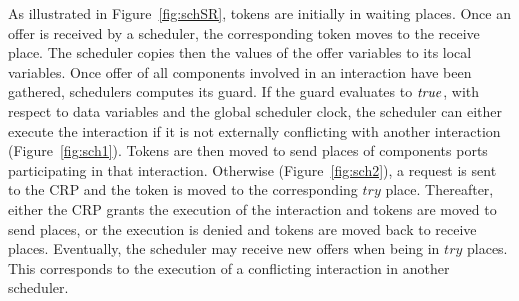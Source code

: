As illustrated in Figure~\ref{fig:schSR}, tokens are initially in waiting places. Once an offer
is received by a scheduler, the corresponding token moves to the receive place. The scheduler
copies then the values of the offer variables to its local variables. Once offer of all 
components involved in an interaction have been gathered, schedulers computes its guard. If 
the guard evaluates to $\textnormal{\textit{true}}$, with respect to data variables and the global scheduler clock,
the scheduler can either execute the interaction if it is not externally conflicting with
another interaction (Figure~\ref{fig:sch1}). Tokens are then moved to send places of components
ports participating in that interaction. Otherwise (Figure~\ref{fig:sch2}), 
a request is sent to the CRP and the token is moved to the
corresponding $try$ place. Thereafter, either the CRP grants the execution of the interaction
and tokens are moved to send places, or the execution is denied and tokens are moved back
to receive places. Eventually, the scheduler may receive new offers when being in $try$
places. This corresponds to the execution of a conflicting interaction in another scheduler.


